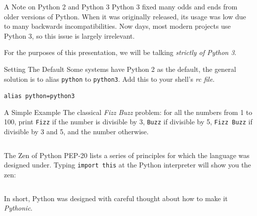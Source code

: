 \documentclass{lug}
\begin{document}
\begin{frame}{A Note on Python 2 and Python 3}
    Python 3 fixed many odds and ends from older versions of Python. When it
    was originally released, its usage was low due to many backwards
    incompatibilities. Now days, most modern projects use Python 3, so this
    issue is largely irrelevant.

    For the purposes of this presentation, we will be talking \emph{strictly of
    Python 3}.

    \pause
    \medskip

%

    \begin{block}{Setting The Default}
        \small
        Some systems have Python 2 as the default, the general solution is to
        alias \texttt{python} to \texttt{python3}. Add this to your shell's
        \emph{rc file}.

        \texttt{alias python=python3}
    \end{block}
\end{frame}

\begin{frame}{A Simple Example}
    The classical \emph{Fizz Buzz} problem: for all the numbers from 1 to 100,
    print \texttt{Fizz} if the number is divisible by 3, \texttt{Buzz} if
    divisible by 5, \texttt{Fizz Buzz} if divisible by 3 and 5, and the number
    otherwise.

    \inputminted{python3}{examples/fizzbuzz.py}
\end{frame}

\begin{frame}{The Zen of Python}
    PEP-20 lists a series of principles for which the language was designed
    under. Typing \texttt{import this} at the Python interpreter will show you
    the zen:

    \inputminted{pycon}{console/importthis.py}

    \pause

    In short, Python was designed with careful thought about how to make it
    \emph{Pythonic}.
\end{frame}
\end{document}
